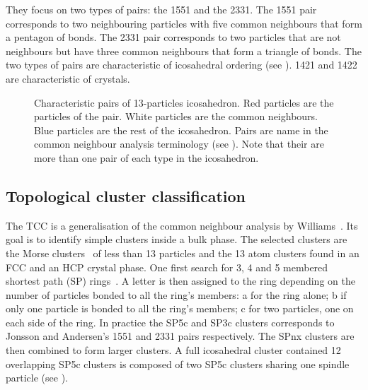 They focus on two types of pairs: the 1551 and the 2331. The 1551 pair corresponds to two neighbouring particles with five common neighbours that form a pentagon of bonds. The 2331 pair corresponds to two particles that are not neighbours but have three common neighbours that form a triangle of bonds. The two types of pairs are characteristic of icosahedral ordering (see ). 1421 and 1422 are characteristic of crystals.

\begin{figure}
	\centering
	\quad
	\caption{Characteristic pairs of 13-particles icosahedron. Red particles are the particles of the pair. White particles are the common neighbours. Blue particles are the rest of the icosahedron. Pairs are name in the common neighbour analysis terminology (see ). Note that their are more than one pair of each type in the icosahedron.}
	\label{fig:commonNgb}
\end{figure}

\subsection{Topological cluster classification}
\label{sec:TCC}

The \acf{TCC} is a generalisation of the common neighbour analysis by Williams~\citep{Williams2007}. Its goal is to identify simple clusters inside a bulk phase. The selected clusters are the Morse clusters~\citep{doye1995effect} of less than 13 particles and the 13 atom clusters found in an \ac{FCC} and an \ac{HCP} crystal phase. One first search for 3, 4 and 5 membered shortest path (SP) rings~\citep{Franzblau1991}. A letter is then assigned to the ring depending on the number of particles bonded to all the ring's members: a for the ring alone; b if only one particle is bonded to all the ring's members; c for two particles, one on each side of the ring. In practice the SP5c and SP3c clusters corresponds to Jonsson and Andersen's 1551 and 2331 pairs respectively. The SPnx clusters are then combined to form larger clusters. A full icosahedral cluster contained 12 overlapping SP5c clusters is composed of two SP5c clusters sharing one spindle particle (see ).

